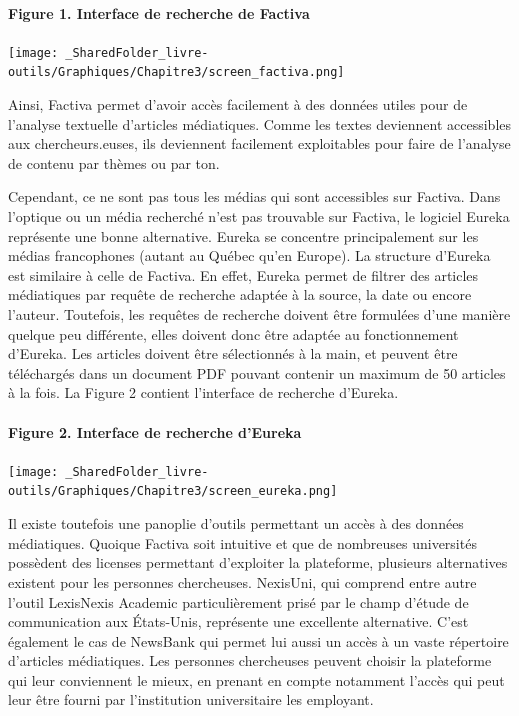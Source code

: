\documentclass[
  letterpaper,
]{scrbook}
\let\oldparagraph\paragraph
\renewcommand{\paragraph}[1]{\oldparagraph{#1}\mbox{}}
\begin{document}
\hypertarget{figure-1.-interface-de-recherche-de-factiva}{%
\paragraph{Figure 1. Interface de recherche de
Factiva}\label{figure-1.-interface-de-recherche-de-factiva}}

\texttt{[image: \_SharedFolder\_livre-outils/Graphiques/Chapitre3/screen\_factiva.png]}

Ainsi, Factiva permet d'avoir accès facilement à des données utiles pour
de l'analyse textuelle d'articles médiatiques. Comme les textes
deviennent accessibles aux chercheurs.euses, ils deviennent facilement
exploitables pour faire de l'analyse de contenu par thèmes ou par ton.

Cependant, ce ne sont pas tous les médias qui sont accessibles sur
Factiva. Dans l'optique ou un média recherché n'est pas trouvable sur
Factiva, le logiciel Eureka représente une bonne alternative. Eureka se
concentre principalement sur les médias francophones (autant au Québec
qu'en Europe). La structure d'Eureka est similaire à celle de Factiva.
En effet, Eureka permet de filtrer des articles médiatiques par requête
de recherche adaptée à la source, la date ou encore l'auteur. Toutefois,
les requêtes de recherche doivent être formulées d'une manière quelque
peu différente, elles doivent donc être adaptée au fonctionnement
d'Eureka. Les articles doivent être sélectionnés à la main, et peuvent
être téléchargés dans un document PDF pouvant contenir un maximum de 50
articles à la fois. La Figure 2 contient l'interface de recherche
d'Eureka.

\hypertarget{figure-2.-interface-de-recherche-deureka}{%
\paragraph{Figure 2. Interface de recherche
d'Eureka}\label{figure-2.-interface-de-recherche-deureka}}

\texttt{[image: \_SharedFolder\_livre-outils/Graphiques/Chapitre3/screen\_eureka.png]}

Il existe toutefois une panoplie d'outils permettant un accès à des
données médiatiques. Quoique Factiva soit intuitive et que de nombreuses
universités possèdent des licenses permettant d'exploiter la plateforme,
plusieurs alternatives existent pour les personnes chercheuses.
NexisUni, qui comprend entre autre l'outil LexisNexis Academic
particulièrement prisé par le champ d'étude de communication aux
États-Unis, représente une excellente alternative. C'est également le
cas de NewsBank qui permet lui aussi un accès à un vaste répertoire
d'articles médiatiques. Les personnes chercheuses peuvent choisir la
plateforme qui leur conviennent le mieux, en prenant en compte notamment
l'accès qui peut leur être fourni par l'institution universitaire les
employant.
\end{document}
